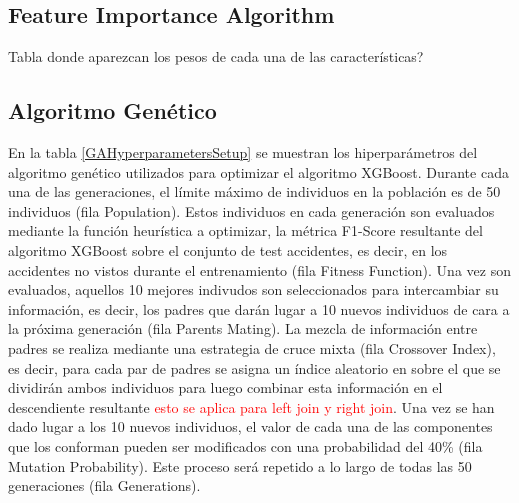 \documentclass{uathesis-es}
\begin{document}





\subsection{Feature Importance Algorithm}

Tabla donde aparezcan los pesos de cada una de las características?

\subsection{Algoritmo Genético}


En la tabla \ref{GAHyperparametersSetup} se muestran los hiperparámetros del algoritmo genético utilizados para optimizar el algoritmo XGBoost. Durante cada una de las generaciones, el límite máximo de individuos en la población es de 50 individuos (fila Population). Estos individuos en cada generación son evaluados mediante la función heurística a optimizar, la métrica F1-Score resultante del algoritmo XGBoost sobre el conjunto de test accidentes, es decir, en los accidentes no vistos durante el entrenamiento (fila Fitness Function). Una vez son evaluados, aquellos 10 mejores indivudos son seleccionados para intercambiar su información, es decir, los padres que darán lugar a 10 nuevos individuos de cara a la próxima generación (fila Parents Mating). La mezcla de información entre padres se realiza mediante una estrategia de cruce mixta (fila Crossover Index), es decir, para cada par de padres se asigna un índice aleatorio en sobre el que se dividirán ambos individuos para luego combinar esta información en el descendiente resultante \textcolor{red}{esto se aplica para left join y right join}. Una vez se han dado lugar a los 10 nuevos individuos, el valor de cada una de las componentes que los conforman pueden ser modificados con una probabilidad del 40\% (fila Mutation Probability). Este proceso será repetido a lo largo de todas las 50 generaciones (fila Generations).
\end{document}
